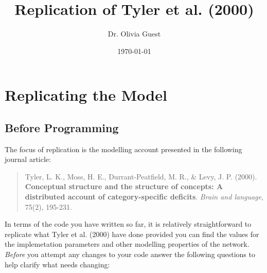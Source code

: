 \documentclass[a4paper,10pt]{article}
\title{Replication of Tyler et al. (2000)}
\author{Dr. Olivia Guest}
\date{\today}
\begin{document}
\maketitle
\section{Replicating the Model}
\subsection{Before Programming}
The focus of replication is the modelling account presented in the following journal article:
\begin{quote}
Tyler, L. K., Moss, H. E., Durrant-Peatfield, M. R., \& Levy, J. P. (2000). \textbf{Conceptual structure and the structure of concepts: A distributed account of category-specific deficits}. \textit{Brain and language}, 75(2), 195-231.
\end{quote}
In terms of the code you have written so far, it is relatively straightforward to replicate what Tyler et al. (2000) have done provided you can find the values for the implemetation parameters and other modelling properties of the network. \emph{Before} you attempt any changes to your code answer the following questions to help clarify what needs changing: 
\end{document}
